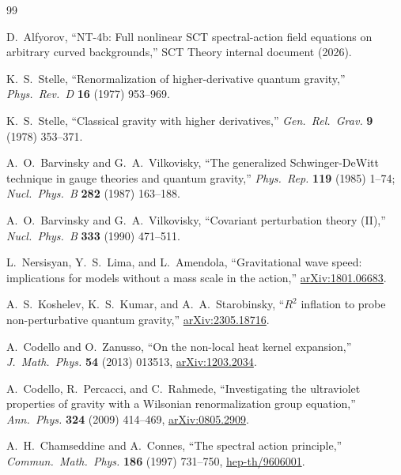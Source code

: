 \documentclass[11pt,a4paper]{article}
\theoremstyle{plain}
\theoremstyle{definition}
\begin{document}
\begin{thebibliography}{99}

D.~Alfyorov,
``NT-4b: Full nonlinear SCT spectral-action field equations on
arbitrary curved backgrounds,'' SCT Theory internal document (2026).

K.~S.~Stelle,
``Renormalization of higher-derivative quantum gravity,''
\emph{Phys.\ Rev.\ D} \textbf{16} (1977) 953--969.

K.~S.~Stelle,
``Classical gravity with higher derivatives,''
\emph{Gen.\ Rel.\ Grav.} \textbf{9} (1978) 353--371.

A.~O.~Barvinsky and G.~A.~Vilkovisky,
``The generalized Schwinger-DeWitt technique in gauge theories and
quantum gravity,''
\emph{Phys.\ Rep.} \textbf{119} (1985) 1--74;
\emph{Nucl.\ Phys.\ B} \textbf{282} (1987) 163--188.

A.~O.~Barvinsky and G.~A.~Vilkovisky,
``Covariant perturbation theory (II),''
\emph{Nucl.\ Phys.\ B} \textbf{333} (1990) 471--511.

L.~Nersisyan, Y.~S.~Lima, and L.~Amendola,
``Gravitational wave speed: implications for models without a mass
scale in the action,''
\href{https://arxiv.org/abs/1801.06683}{arXiv:1801.06683}.

A.~S.~Koshelev, K.~S.~Kumar, and A.~A.~Starobinsky,
``$R^2$ inflation to probe non-perturbative quantum gravity,''
\href{https://arxiv.org/abs/2305.18716}{arXiv:2305.18716}.

A.~Codello and O.~Zanusso,
``On the non-local heat kernel expansion,''
\emph{J.\ Math.\ Phys.} \textbf{54} (2013) 013513,
\href{https://arxiv.org/abs/1203.2034}{arXiv:1203.2034}.

A.~Codello, R.~Percacci, and C.~Rahmede,
``Investigating the ultraviolet properties of gravity with a
Wilsonian renormalization group equation,''
\emph{Ann.\ Phys.} \textbf{324} (2009) 414--469,
\href{https://arxiv.org/abs/0805.2909}{arXiv:0805.2909}.

A.~H.~Chamseddine and A.~Connes,
``The spectral action principle,''
\emph{Commun.\ Math.\ Phys.} \textbf{186} (1997) 731--750,
\href{https://arxiv.org/abs/hep-th/9606001}{hep-th/9606001}.

\end{thebibliography}
\end{document}

